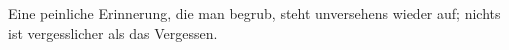 Eine peinliche Erinnerung, die man begrub, steht unversehens wieder auf; nichts ist vergesslicher als das Vergessen.
\par

